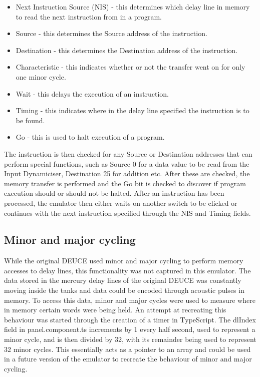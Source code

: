 \documentclass{l4proj}
\begin{document}
\begin{itemize}
	\item Next Instruction Source (NIS) - this determines which delay line in memory to read the next instruction from in a program.
	\item Source - this determines the Source address of the instruction.
	\item Destination - this determines the Destination address of the instruction.
	\item Characteristic - this indicates whether or not the transfer went on for only one minor cycle.
	\item Wait - this delays the execution of an instruction.
	\item Timing - this indicates where in the delay line specified the instruction is to be found.
	\item Go - this is used to halt execution of a program.
\end{itemize}

The instruction is then checked for any Source or Destination addresses that can perform special functions, such as Source 0 for a data value to be read from the Input Dynamiciser, Destination 25 for addition etc. After these are checked, the memory transfer is performed and the Go bit is checked to discover if program execution should or should not be halted. After an instruction has been processed, the emulator then either waits on another switch to be clicked or continues with the next instruction specified through the NIS and Timing fields.

\subsection{Minor and major cycling}
While the original DEUCE used minor and major cycling to perform memory accesses to delay lines, this functionality was not captured in this emulator. The data stored in the mercury delay lines of the original DEUCE was constantly moving inside the tanks and data could be encoded through acoustic pulses in memory. To access this data, minor and major cycles were used to measure where in memory certain words were being held. An attempt at recreating this behaviour was started through the creation of a timer in TypeScript. The dlIndex field in panel.component.ts increments by 1 every half second, used to represent a minor cycle, and is then divided by 32, with its remainder being used to represent 32 minor cycles. This essentially acts as a pointer to an array and could be used in a future version of the emulator to recreate the behaviour of minor and major cycling.
\end{document}
